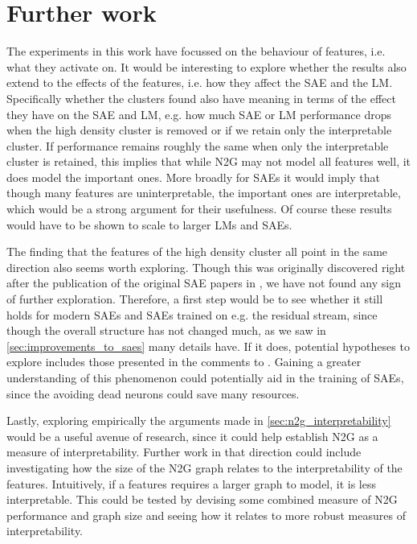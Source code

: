 \section{Further work}
The experiments in this work have focussed on the behaviour of features, i.e. what they activate on.
It would be interesting to explore whether the results also extend to the effects of the features, i.e. how they affect the \ac{SAE} and the \ac{LM}.
Specifically whether the clusters found also have meaning in terms of the effect they have on the \ac{SAE} and \ac{LM}, e.g. how much \ac{SAE} or \ac{LM} performance drops when the high density cluster is removed or if we retain only the interpretable cluster.
If performance remains roughly the same when only the interpretable cluster is retained, this implies that while \ac{N2G} may not model all features well, it does model the important ones.
More broadly for \acp{SAE} it would imply that though many features are uninterpretable, the important ones are interpretable, which would be a strong argument for their usefulness.
Of course these results would have to be shown to scale to larger \acp{LM} and \acp{SAE}.

The finding that the features of the high density cluster all point in the same direction also seems worth exploring.
Though this was originally discovered right after the publication of the original \ac{SAE} papers in \textcite{nanda_open_2023}, we have not found any sign of further exploration.
Therefore, a first step would be to see whether it still holds for modern \acp{SAE} and \acp{SAE} trained on e.g. the residual stream, since though the overall structure has not changed much, as we saw in \autoref{sec:improvements_to_saes} many details have.
If it does, potential hypotheses to explore includes those presented in the comments to \textcite{nanda_open_2023}.
Gaining a greater understanding of this phenomenon could potentially aid in the training of \acp{SAE}, since the avoiding dead neurons could save many resources.

Lastly, exploring empirically the arguments made in \autoref{sec:n2g_interpretability} would be a useful avenue of research, since it could help establish \ac{N2G} as a measure of interpretability.
Further work in that direction could include investigating how the size of the \ac{N2G} graph relates to the interpretability of the features.
Intuitively, if a features requires a larger graph to model, it is less interpretable.
This could be tested by devising some combined measure of \ac{N2G} performance and graph size and seeing how it relates to more robust measures of interpretability.
